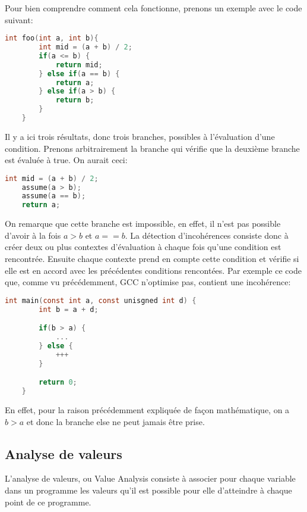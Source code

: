 Pour bien comprendre comment cela fonctionne, prenons un exemple avec le code suivant:
\begin{lstlisting}[language=c, xleftmargin=.2\textwidth, caption={Programme d'exemple pour la détection d'incohérence}, captionpos=b]
    int foo(int a, int b){
        int mid = (a + b) / 2;
        if(a <= b) {
            return mid;
        } else if(a == b) {
            return a;
        } else if(a > b) {
            return b;
        }
    }
\end{lstlisting}
Il y a ici trois résultats, donc trois branches, possibles à l'évaluation d'une condition. Prenons arbitrairement la branche qui vérifie que la deuxième branche est évaluée à true. On aurait ceci:
\begin{lstlisting}[language=c, xleftmargin=.2\textwidth, caption={Deuxième branche évaluée à true du programme}, captionpos=b]
    int mid = (a + b) / 2;
    assume(a > b);
    assume(a == b);
    return a;
\end{lstlisting}
On remarque que cette branche est impossible, en effet, il n'est pas possible d'avoir à la fois $a > b$ et $a == b$. La détection d'incohérences consiste donc à créer deux ou plus contextes d'évaluation à chaque fois qu'une condition est rencontrée. Ensuite chaque contexte prend en compte cette condition et vérifie si elle est en accord avec les précédentes conditions rencontées. Par exemple ce code que, comme vu précédemment, GCC n'optimise pas, contient une incohérence:
\begin{lstlisting}[language=c, xleftmargin=.2\textwidth, caption={Exemple d'incohérence non optimisé par GCC}, captionpos=b]
    int main(const int a, const unisgned int d) {
        int b = a + d;

        if(b > a) {
            ...
        } else {
            +++
        }

        return 0;
    }
\end{lstlisting}
En effet, pour la raison précédemment expliquée de façon mathématique, on a $b > a$ et donc la branche else ne peut jamais être prise.

\subsection{Analyse de valeurs}
L'analyse de valeurs, ou \og Value Analysis \fg{} consiste à associer pour chaque variable dans un programme les valeurs qu'il est possible pour elle d'atteindre à chaque point de ce programme.

